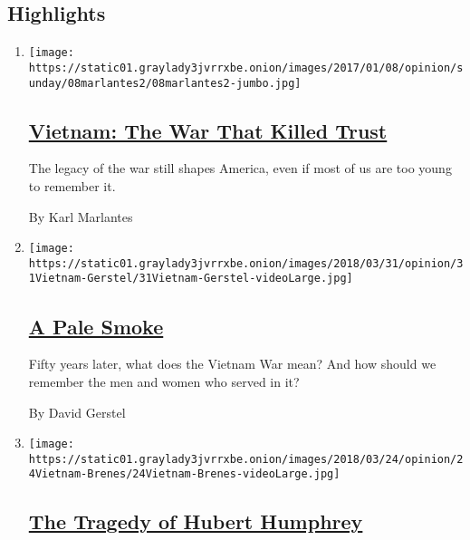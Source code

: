 \hypertarget{highlights}{%
\subsection{Highlights}\label{highlights}}

\begin{enumerate}
\def\labelenumi{\arabic{enumi}.}
\item
  \texttt{[image: https://static01.graylady3jvrrxbe.onion/images/2017/01/08/opinion/sunday/08marlantes2/08marlantes2-jumbo.jpg]}

  \hypertarget{vietnam-the-war-that-killed-trust}{%
  \subsection{\texorpdfstring{\href{/2017/01/07/opinion/sunday/vietnam-the-war-that-killed-trust.html}{Vietnam:
  The War That Killed
  Trust}}{Vietnam: The War That Killed Trust}}\label{vietnam-the-war-that-killed-trust}}

  The legacy of the war still shapes America, even if most of us are too
  young to remember it.

  By Karl Marlantes
\item
  \texttt{[image: https://static01.graylady3jvrrxbe.onion/images/2018/03/31/opinion/31Vietnam-Gerstel/31Vietnam-Gerstel-videoLarge.jpg]}

  \hypertarget{a-pale-smoke}{%
  \subsection{\texorpdfstring{\href{/2018/03/30/opinion/vietnam-fifty-years-later.html}{A
  Pale Smoke}}{A Pale Smoke}}\label{a-pale-smoke}}

  Fifty years later, what does the Vietnam War mean? And how should we
  remember the men and women who served in it?

  By David Gerstel
\item
  \texttt{[image: https://static01.graylady3jvrrxbe.onion/images/2018/03/24/opinion/24Vietnam-Brenes/24Vietnam-Brenes-videoLarge.jpg]}

  \hypertarget{the-tragedy-of-hubert-humphrey}{%
  \subsection{\texorpdfstring{\href{/2018/03/23/opinion/vietnam-hubert-humphrey.html}{The
  Tragedy of Hubert
  Humphrey}}{The Tragedy of Hubert Humphrey}}\label{the-tragedy-of-hubert-humphrey}}


\end{enumerate}
